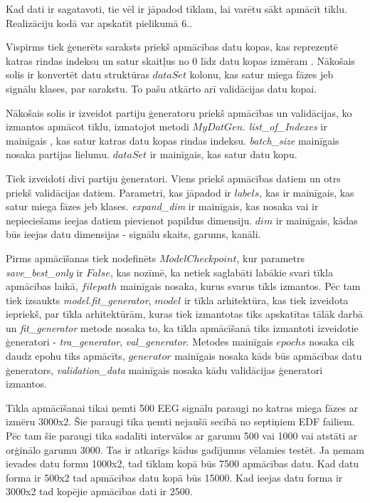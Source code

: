 \documentclass[12pt,paper=A4]{report}
\begin{document}
  
Kad dati ir sagatavoti, tie vēl ir jāpadod tīklam, lai varētu sākt apmācīt tīklu. Realizāciju kodā var apskatīt pielikumā 6.. 

Vispirms tiek ģenerēts saraksts priekš apmācības datu kopas, kas reprezentē katras rindas indeksu un satur skaitļus no 0 līdz datu kopas izmēram . Nākošais solis ir konvertēt datu struktūras $dataSet$ kolonu, kas satur miega fāzes jeb signālu klases, par sarakstu. To pašu atkārto arī validācijas datu kopai. 
 
Nākošais solis ir izveidot partiju ģeneratoru priekš apmācības un validācijas, ko izmantos apmācot tīklu, izmatojot metodi $MyDatGen$. 
\textit{list_of_Indexes} ir mainīgais , kas satur katras datu kopas rindas indeksu. \textit{batch_size} mainīgais nosaka partijas lielumu. $dataSet$ ir mainīgais, kas satur datu kopu. 

Tiek izveidoti divi partiju ģeneratori. Viens priekš apmācības datiem un otrs priekš validācijas datiem. Parametri, kas jāpadod ir $labels$, kas ir mainīgais, kas satur miega fāzes jeb klases. \textit{expand_dim} ir mainīgais, kas nosaka vai ir nepieciešams ieejas datiem pievienot papildus dimensiju. $dim$ ir mainīgais, kādas būs ieejas datu dimensijas - signālu skaits, garums, kanāli. 


Pirms apmācīšanas tiek nodefinēts $ModelCheckpoint$, kur parametrs \textit{save_best_only} ir $False$, kas nozīmē, ka netiek saglabāti labākie svari tīkla apmācības laikā, $filepath$ mainīgais nosaka, kurus svarus tīkls izmantos. Pēc tam tiek izsaukts \textit{model.fit_generator}, $model$ ir tīkla arhitektūra, kas tiek izveidota iepriekš, par tīkla arhitektūrām, kuras tiek izmantotas tiks apskatītas tālāk darbā un \textit{fit_generator} metode nosaka to, ka tīkla apmācīšanā tiks izmantoti izveidotie ģeneratori - \textit{tra_generator}, \textit{val_generator}. Metodes mainīgais $epochs$ nosaka cik daudz epohu tiks apmācīts, $generator$ mainīgais nosaka kāds būs apmācības datu ģenerators, \textit{validation_data} mainīgais nosaka kādu validācijas ģeneratori izmantos.

Tīkla apmācīšanai tikai ņemti 500 EEG signālu paraugi no katras miega fāzes ar izmēru 3000x2. Šie paraugi tika ņemti nejaušā secībā no septiņiem EDF failiem. Pēc tam šie paraugi tika sadalīti intervālos ar garumu 500 vai 1000 vai atstāti ar orģinālo garumu 3000. Tas ir atkarīgs kādus gadījumus vēlamies testēt. Ja ņemam ievades datu formu 1000x2, tad tīklam kopā būs 7500 apmācības datu. Kad datu forma ir 500x2 tad apmācības datu kopā būs 15000. Kad ieejas datu forma ir 3000x2 tad kopējie apmācības dati ir 2500. 
\end{document}
